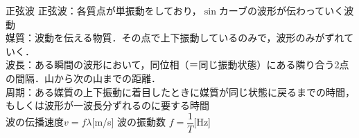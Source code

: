 \begin{matome}{正弦波}
 \hspace{3mm} 正弦波：各質点が単振動をしており，$\sin$カーブの波形が伝わっていく波動\\
\hspace{3mm} 媒質：波動を伝える物質．その点で上下振動しているのみで，波形のみがずれていく．\\
\hspace{3mm} 波長：ある瞬間の波形において，同位相（＝同じ振動状態）にある隣り合う2点の間隔．山から次の山までの距離．\\
\hspace{3mm} 周期：ある媒質の上下振動に着目したときに媒質が同じ状態に戻るまでの時間，もしくは波形が一波長分ずれるのに要する時間\\
\hspace{4mm} 波の伝播速度\hspace{5mm}$v=f\lambda$\hspace{2mm}[m/s] \hspace{10mm} 波の振動数\hspace{5mm} $f=\dfrac{1}{T}$\hspace{2mm}[Hz]
 \end{matome}

